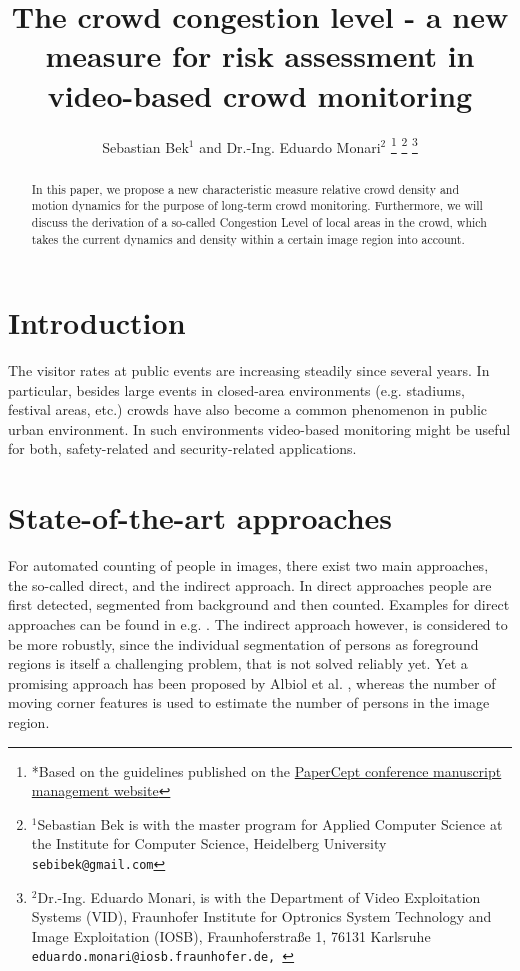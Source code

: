 \documentclass[a4paper, 10pt, journal]{wissarbIEEE}      %
\title{\LARGE \bf
The crowd congestion level - a new measure for risk assessment in video-based crowd monitoring
}
\author{Sebastian Bek$^{1}$ and Dr.-Ing. Eduardo Monari$^{2}$%
\thanks{*Based on the guidelines published on the \href{http://conf.papercept.net/conferences/support/tex.php}{PaperCept conference manuscript management website}}%
\thanks{$^{1}$Sebastian Bek is with the master program for Applied Computer Science at the Institute for Computer Science, Heidelberg University
        {\tt\small sebibek@gmail.com}}%
\thanks{$^{2}$Dr.-Ing. Eduardo Monari, is with the Department of Video Exploitation Systems (VID), Fraunhofer Institute for Optronics System Technology and Image Exploitation (IOSB), Fraunhoferstraße 1, 76131 Karlsruhe
        {\tt\small eduardo.monari@iosb.fraunhofer.de, \href{https://www.iosb.fraunhofer.de}{}}}%
}
\begin{document}
\maketitle

\begin{abstract}

In this paper, we propose a new characteristic measure relative crowd density and motion dynamics for the purpose of long-term crowd monitoring. Furthermore, we will discuss the derivation of a so-called Congestion Level of local areas in the crowd, which takes the current dynamics and density within a certain image region into account.

\end{abstract}

\section{Introduction}
\label{sec:intro}
The visitor rates at public events are increasing steadily since several years. In particular, besides large events in closed-area environments (e.g. stadiums, festival areas, etc.) crowds have also become a common phenomenon in public urban environment. In such environments video-based monitoring might be useful for both, safety-related and security-related applications.

\section{State-of-the-art approaches}
\label{sec:sota}
For automated counting of people in images, there exist two main approaches, the so-called direct, and the indirect approach. In direct approaches people are first detected, segmented from background and then counted. Examples for direct approaches can be found in e.g. \cite{rittscher}. The indirect approach however, is considered to be more robustly, since the individual segmentation of persons as foreground regions is itself a challenging problem, that is not solved reliably yet. Yet a promising approach has been proposed by Albiol et al. \cite{albiol}, whereas the number of moving corner features is used to estimate the number of persons in the image region.
\end{document}
